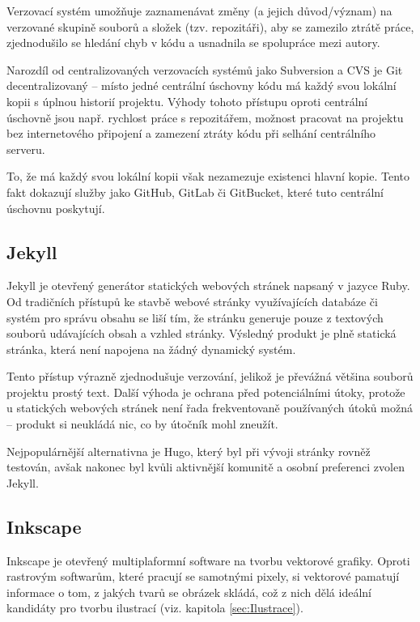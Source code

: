\documentclass[a4paper, 12pt]{article}
\begin{document}
  Verzovací systém umožňuje zaznamenávat změny (a jejich důvod/význam) na verzované skupině souborů a složek (tzv. repozitáři), aby se zamezilo ztrátě práce, zjednodušilo se hledání chyb v kódu a usnadnila se spolupráce mezi autory.

  Narozdíl od centralizovaných verzovacích systémů jako Subversion a CVS je Git decentralizovaný -- místo jedné centrální úschovny kódu má každý svou lokální kopii s úplnou historií projektu. Výhody tohoto přístupu oproti centrální úschovně jsou např. rychlost práce s repozitářem, možnost pracovat na projektu bez internetového připojení a zamezení ztráty kódu při selhání centrálního serveru\cite{cvcs-vs-dvcs}.

  To, že má každý svou lokální kopii však nezamezuje existenci hlavní kopie. Tento fakt dokazují služby jako GitHub, GitLab či GitBucket, které tuto centrální úschovnu poskytují.


  \subsection{Jekyll} \label{sec:Jekyll}
  Jekyll je otevřený\cite{jekyll-source} generátor statických webových stránek napsaný v jazyce Ruby. Od tradičních přístupů ke stavbě webové stránky využívajících databáze či systém pro správu obsahu se liší tím, že stránku generuje pouze z textových souborů udávajících obsah a vzhled stránky. Výsledný produkt je plně statická stránka, která není napojena na žádný dynamický systém.

  Tento přístup výrazně zjednodušuje verzování, jelikož je převážná většina souborů projektu prostý text. Další výhoda je ochrana před potenciálními útoky, protože u statických webových stránek není řada frekventovaně používaných útoků možná -- produkt si neukládá nic, co by útočník mohl zneužít.

  Nejpopulárnější alternativna je Hugo, který byl při vývoji stránky rovněž testován, avšak nakonec byl kvůli aktivnější komunitě a osobní preferenci zvolen Jekyll.


  \subsection{Inkscape} \label{sec:Inkscape}
  Inkscape je otevřený\cite{inkscape-source} multiplaformní software na tvorbu vektorové grafiky. Oproti rastrovým softwarům, které pracují se samotnými pixely, si vektorové pamatují informace o tom, z jakých tvarů se obrázek skládá, což z nich dělá ideální kandidáty pro tvorbu ilustrací (viz. kapitola \ref{sec:Ilustrace}).
\end{document}
